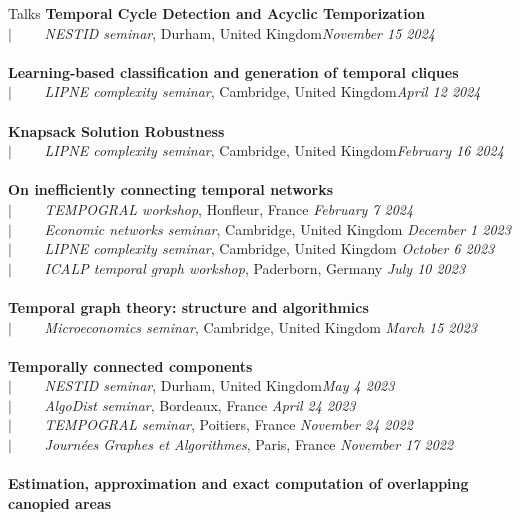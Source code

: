 \documentclass[french]{resume} %
\begin{document}
	\begin{rSection}{Talks}
		{\bf Temporal Cycle Detection and Acyclic Temporization} \\
		$| \qquad$ \textit{NESTID seminar}, Durham, United Kingdom\hfill {\em November 15 2024} 
		\\ \\
		{\bf Learning-based classification and generation of temporal cliques} \\
		$| \qquad$ \textit{LIPNE complexity seminar}, Cambridge, United Kingdom\hfill {\em April 12 2024} 
		\\ \\
		{\bf Knapsack Solution Robustness} \\
		$| \qquad$ \textit{LIPNE complexity seminar}, Cambridge, United Kingdom\hfill {\em February 16 2024} 
		\\ \\
		{\bf On inefficiently connecting temporal networks} \\
		$| \qquad$ \textit{TEMPOGRAL workshop}, Honfleur, France \hfill {\em February 7 2024} \\
		$| \qquad$ \textit{Economic networks seminar}, Cambridge, United Kingdom \hfill {\em December 1 2023} \\
		$| \qquad$ \textit{LIPNE complexity seminar}, Cambridge, United Kingdom \hfill {\em October 6 2023} \\
		$| \qquad$ \textit{ICALP temporal graph workshop}, Paderborn, Germany \hfill {\em July 10 2023}
		\\ \\
		{\bf Temporal graph theory: structure and algorithmics} \\
		$| \qquad$ \textit{Microeconomics seminar}, Cambridge, United Kingdom \hfill {\em March 15 2023} 
		\\ \\
		{\bf Temporally connected components} \\
		$| \qquad$ \textit{NESTID seminar}, Durham, United Kingdom\hfill {\em May 4 2023} \\
		$| \qquad$ \textit{AlgoDist seminar}, Bordeaux, France \hfill {\em April 24 2023} \\
		$| \qquad$ \textit{TEMPOGRAL seminar}, Poitiers, France \hfill {\em November 24 2022} \\
		$| \qquad$ \textit{Journées Graphes et Algorithmes}, Paris, France \hfill {\em November 17 2022}
		\\ \\
		{\bf Estimation, approximation and exact computation of overlapping canopied areas} \\

\end{rSection}
\end{document}
